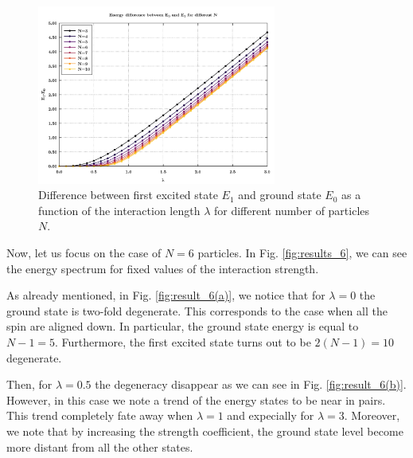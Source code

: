 \documentclass[rmp,10pt,onecolumn,fleqn,notitlepage]{revtex4-1}
\begin{document}
\begin{figure}[H]
\centering
\includegraphics[width=0.7\textwidth]{image/diff.pdf}
\caption{\label{fig:diff} Difference between first excited state \( E_1 \) and ground state \( E_0 \) as a function of the interaction length \( \lambda  \) for different number of particles \( N \).}
\end{figure}

Now, let us focus on the case of $N=6$ particles. In Fig. \ref{fig:results_6}, we can see the energy spectrum for fixed values of the interaction strength.

As already mentioned, in Fig. \ref{fig:result_6(a)}, we notice that for \( \lambda =0 \) the ground state is two-fold degenerate. This corresponds to the case when all the spin are aligned down. In particular, the ground state energy is equal to $N-1=5$.
Furthermore, the first excited state turns out to be $2(N-1)=10$ degenerate.

Then, for \( \lambda =0.5 \) the degeneracy disappear as we can see in Fig. \ref{fig:result_6(b)}. However, in this case we note a trend of the energy states to be near in pairs. This trend completely fate away when \( \lambda = 1 \) and expecially for \( \lambda =3 \). Moreover, we note that by increasing the strength coefficient, the ground state level become more distant from all the other states.
\end{document}
